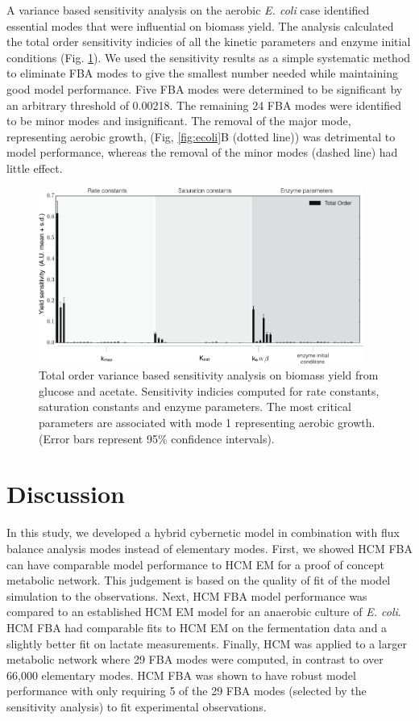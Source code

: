 \documentclass[10pt,twocolumn,twoside,final]{IEEEtran}
\begin{document}
A variance based sensitivity analysis on the aerobic \textit{E. coli} case identified essential modes that were influential on biomass yield. 
The analysis calculated the total order sensitivity indicies of all the kinetic parameters and enzyme initial conditions (Fig. \ref{fig:sensitivity}).
We used the sensitivity results as a simple systematic method to eliminate FBA modes to give the smallest number needed while maintaining good model performance.   
Five FBA modes were determined to be significant by an arbitrary threshold of 0.00218. 
The remaining 24 FBA modes were identified to be minor modes and insignificant. 
The removal of the major mode, representing aerobic growth, (Fig, \ref{fig:ecoli}B (dotted line)) was detrimental to model performance, whereas the removal of the minor modes (dashed line) had little effect. 


\begin{figure}[!t]\centering
\includegraphics[width=0.95\textwidth]{./figs/Fig-3-Sensitivity-Results.pdf}
\caption{Total order variance based sensitivity analysis on biomass yield from glucose and acetate. Sensitivity indicies computed for rate constants, saturation constants and enzyme parameters. The most critical parameters are associated with mode 1 representing aerobic growth. (Error bars represent 95\% confidence intervals).    
}
\label{fig:sensitivity}
\end{figure} 



\section{Discussion}
In this study, we developed a hybrid cybernetic model in combination with flux balance analysis modes instead of elementary modes. 
First, we showed HCM FBA can have comparable model performance to HCM EM for a proof of concept metabolic network. 
This judgement is based on the quality of fit of the model simulation to the observations. 
Next, HCM FBA model performance was compared to an established HCM EM model\cite{2008_kim_varner_ramkrishna_BiotechProg} for an anaerobic culture of \textit{E. coli}. 
HCM FBA had comparable fits to HCM EM on the fermentation data and a slightly better fit on lactate measurements. 
Finally, HCM was applied to a larger metabolic network where 29 FBA modes were computed, in contrast to over 66,000 elementary modes.  
HCM FBA was shown to have robust model performance with only requiring 5 of the 29 FBA modes (selected by the sensitivity analysis) to fit experimental observations.
\end{document}
